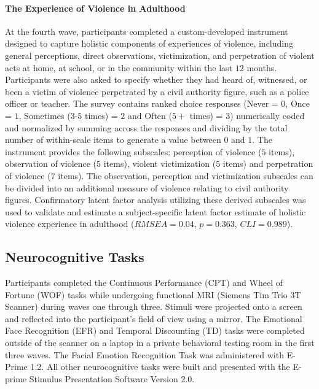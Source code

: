 \documentclass[utf8]{frontiersSCNS} %
\begin{document}
\paragraph{The Experience of Violence in Adulthood} At the fourth wave, participants completed a custom-developed instrument designed to capture holistic components of experiences of violence, including general perceptions, direct observations, victimization, and perpetration of violent acts at home, at school, or in the community within the last $12$ months. Participants were also asked to specify whether they had heard of, witnessed, or been a victim of violence perpetrated by a civil authority figure, such as a police officer or teacher. The survey contains ranked choice responses (Never = $0$, Once = $1$, Sometimes ($3$-$5$ times) = $2$ and Often ($5+$ times) = $3$) numerically coded and normalized by summing across the responses and dividing by the total number of within-scale items to generate a value between $0$ and $1$. The instrument provides the following subscales: perception of violence ($5$ items), observation of violence ($5$ items), violent victimization ($5$ items) and perpetration of violence ($7$ items). The observation, perception and victimization subscales can be divided into an additional measure of violence relating to civil authority figures. Confirmatory latent factor analysis utilizing these derived subscales was used to validate and estimate a subject-specific latent factor estimate of holistic violence experience in adulthood ($RMSEA = 0.04$, $p = 0.363$, $CLI = 0.989$).
\subsection{Neurocognitive Tasks}  Participants completed the Continuous Performance (CPT) and Wheel of Fortune (WOF) tasks while undergoing functional MRI (Siemens Tim Trio 3T Scanner) during waves one through three. Stimuli were projected onto a screen and reflected into the participant's field of view using a mirror. The Emotional Face Recognition (EFR) and Temporal Discounting (TD) tasks were completed outside of the scanner on a laptop in a private behavioral testing room in the first three waves. The Facial Emotion Recognition Task was administered with E-Prime 1.2. All other neurocognitive tasks were built and presented with the E-prime Stimulus Presentation Software Version 2.0\citep{schneider2002prime}. 
\end{document}
